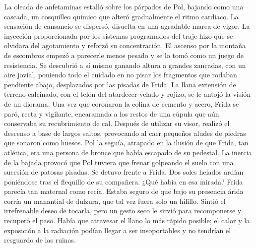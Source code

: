 La oleada de anfetaminas estalló sobre los párpados de Pol, bajando como una cascada, un cosquilleo químico que alteró gradualmente el ritmo cardiaco. La sensación de cansancio se dispersó, disuelta en una agradable marea de vigor. La inyección proporcionada por los sistemas programados del traje hizo que se olvidara del agotamiento y reforzó su concentración. El ascenso por la montaña de escombros empezó a parecerle menos pesado y se lo tomó como un juego de resistencia. Se descubrió a sí mismo ganando altura a grandes zancadas, con un aire jovial, poniendo todo el cuidado en no pisar los fragmentos que rodaban pendiente abajo, desplazados por las pisadas de Frida. La llana extensión de terreno calcinado, con el telón del atardecer velado y rojizo, se le antojó la visión de un diorama. Una vez que coronaron la colina de cemento y acero, Frida se paró, recta y vigilante, encaramada a los restos de una cúpula que aún conservaba su recubrimiento de cal. Después de utilizar su visor, realizó el descenso a base de largos saltos, provocando al caer pequeños aludes de piedras que sonaron como huesos. Pol la seguía, atrapado en la ilusión de que Frida, tan atlética, era una persona de bronce que había escapado de su pedestal. La inercia de la bajada provocó que Pol tuviera que frenar golpeando el suelo con una sucesión de patosas pisadas. Se detuvo frente a Frida. Dos soles helados ardían poniéndose tras el flequillo de su compañera. ¿Qué había en esa mirada? Frida parecía tan maternal como recia. Estaba seguro de que bajo su presencia árida corría un manantial de dulzura, que tal vez fuera solo un hilillo. Sintió el irrefrenable deseo de tocarla, pero un gesto seco le sirvió para recomponerse y recuperó el paso. Había que atravesar el llano lo más rápido posible; el calor y la exposición a la radiación podían llegar a ser insoportables y no tendrían el resguardo de las ruinas. 
